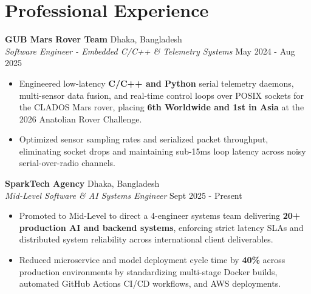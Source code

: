 \documentclass[9.5pt,a4paper]{article}
\begin{document}
\section*{Professional Experience}
\noindent
\textbf{GUB Mars Rover Team} \hfill Dhaka, Bangladesh\\
\textit{Software Engineer - Embedded C/C++ \& Telemetry Systems} \hfill May 2024 - Aug 2025
\begin{itemize}
    \item Engineered low-latency \textbf{C/C++ and Python} serial telemetry daemons, multi-sensor data fusion, and real-time control loops over POSIX sockets for the CLADOS Mars rover, placing \textbf{6th Worldwide and 1st in Asia} at the 2026 Anatolian Rover Challenge.
    \item Optimized sensor sampling rates and serialized packet throughput, eliminating socket drops and maintaining sub-15ms loop latency across noisy serial-over-radio channels.
\end{itemize}
\vspace{0.2pt}
\noindent
\textbf{SparkTech Agency} \hfill Dhaka, Bangladesh\\
\textit{Mid-Level Software \& AI Systems Engineer} \hfill Sept 2025 - Present
\begin{itemize}
    \item Promoted to Mid-Level to direct a 4-engineer systems team delivering \textbf{20+ production AI and backend systems}, enforcing strict latency SLAs and distributed system reliability across international client deliverables.
    \item Reduced microservice and model deployment cycle time by \textbf{40\%} across production environments by standardizing multi-stage Docker builds, automated GitHub Actions CI/CD workflows, and AWS deployments.
\end{itemize}
\vspace{0.2pt}
\end{document}
